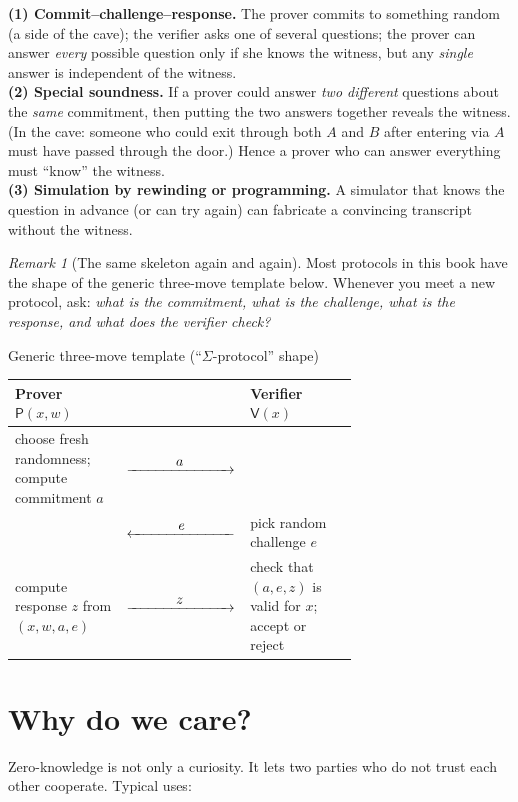 \documentclass[11pt,a4paper]{report}
\makeatletter
\theoremstyle{plain}
\theoremstyle{definition}
\theoremstyle{remark}
\newtheorem{remark}[theorem]{Remark}
\newcommand{\Prv}{\mathsf{P}}\newcommand{\Ver}{\mathsf{V}}
\newcommand{\ra}[1]{\xrightarrow{\makebox[2.5cm]{$#1$}}}
\newcommand{\la}[1]{\xleftarrow{\makebox[2.5cm]{$#1$}}}
\newenvironment{flow}[2]{%
  \par\smallskip\noindent
  \begin{tabular}{@{}L{0.34\linewidth} c L{0.34\linewidth}@{}}
  \textbf{#1} & & \textbf{#2}\\ \hline}{\end{tabular}\par\smallskip}
\makeatother
\begin{document}
\begin{intuition}
\textbf{(1) Commit--challenge--response.} The prover commits to something random (a side of the cave); the verifier asks one of several questions; the prover can answer \emph{every} possible question only if she knows the witness, but any \emph{single} answer is independent of the witness.\\
\textbf{(2) Special soundness.} If a prover could answer \emph{two different} questions about the \emph{same} commitment, then putting the two answers together reveals the witness. (In the cave: someone who could exit through both $A$ and $B$ after entering via $A$ must have passed through the door.) Hence a prover who can answer everything must ``know'' the witness.\\
\textbf{(3) Simulation by rewinding or programming.} A simulator that knows the question in advance (or can try again) can fabricate a convincing transcript without the witness.
\end{intuition}

\begin{remark}[The same skeleton again and again]
Most protocols in this book have the shape of the generic three-move template below. Whenever you meet a new protocol, ask: \emph{what is the commitment, what is the challenge, what is the response, and what does the verifier check?}
\end{remark}

\begin{protocol}{Generic three-move template (``$\Sigma$-protocol'' shape)}
\begin{flow}{Prover $\Prv(x,w)$}{Verifier $\Ver(x)$}
choose fresh randomness; compute commitment $a$ & $\ra{\;a\;}$ & \\
 & $\la{\;e\;}$ & pick random challenge $e$\\
compute response $z$ from $(x,w,a,e)$ & $\ra{\;z\;}$ & check that $(a,e,z)$ is valid for $x$; accept or reject
\end{flow}
\end{protocol}

\section{Why do we care?}
Zero-knowledge is not only a curiosity. It lets two parties who do not trust each other cooperate. Typical uses:
\end{document}
